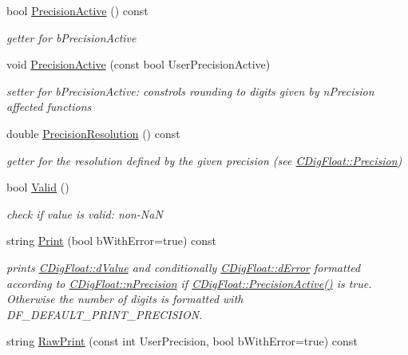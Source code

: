 \begin{DoxyCompactItemize}
bool \hyperlink{classCDigFloat_ad1f2365630c9e35e77c01093e73440c4}{Precision\+Active} () const
\begin{DoxyCompactList}\small\item\em getter for b\+Precision\+Active \end{DoxyCompactList}\item 
void \hyperlink{classCDigFloat_a680354bead4079c14a67688124bb4b85}{Precision\+Active} (const bool User\+Precision\+Active)
\begin{DoxyCompactList}\small\item\em setter for b\+Precision\+Active\+: constrols rounding to digits given by n\+Precision affected functions \end{DoxyCompactList}\item 
double \hyperlink{classCDigFloat_a8b229b407a4adff339f086856b52078b}{Precision\+Resolution} () const
\begin{DoxyCompactList}\small\item\em getter for the resolution defined by the given precision (see \hyperlink{classCDigFloat_ad66e2fc1bb19f491dfbc4fb7bfb20d47}{C\+Dig\+Float\+::\+Precision}) \end{DoxyCompactList}\item 
bool \hyperlink{classCDigFloat_aab339f7e1ffa5c88f3dbb432389752c9}{Valid} ()
\begin{DoxyCompactList}\small\item\em check if value is valid\+: non-\/\+NaN \end{DoxyCompactList}\item 
string \hyperlink{classCDigFloat_a80731e0970f607114d6d1bde4d02bd39}{Print} (bool b\+With\+Error=true) const
\begin{DoxyCompactList}\small\item\em prints \hyperlink{classCDigFloat_a4bbe69e30dd4e20527362493aa9aaf96}{C\+Dig\+Float\+::d\+Value} and conditionally \hyperlink{classCDigFloat_a25eb3782d1e727ff007a48f8308e3d4d}{C\+Dig\+Float\+::d\+Error} formatted according to \hyperlink{classCDigFloat_ad580654be35246d14c91482581c0bc11}{C\+Dig\+Float\+::n\+Precision} if \hyperlink{classCDigFloat_ad1f2365630c9e35e77c01093e73440c4}{C\+Dig\+Float\+::\+Precision\+Active()} is true. Otherwise the number of digits is formatted with D\+F\+\_\+\+D\+E\+F\+A\+U\+L\+T\+\_\+\+P\+R\+I\+N\+T\+\_\+\+P\+R\+E\+C\+I\+S\+I\+ON. \end{DoxyCompactList}\item 
string \hyperlink{classCDigFloat_a7051716ffe1294bab6ed6e194a73618e}{Raw\+Print} (const int User\+Precision, bool b\+With\+Error=true) const

\end{DoxyCompactItemize}
